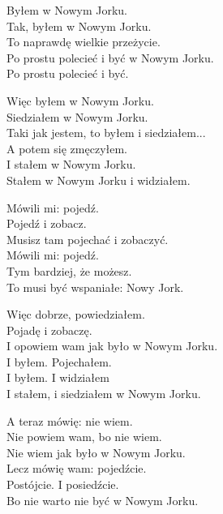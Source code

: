 \begin{text}
    Byłem w Nowym Jorku.\\
    Tak, byłem w Nowym Jorku.\\
    To naprawdę wielkie przeżycie.\\
    Po prostu polecieć i być w Nowym Jorku.\\
    Po prostu polecieć i być.

    Więc byłem w Nowym Jorku.\\
    Siedziałem w Nowym Jorku.\\
    Taki jak jestem, to byłem i siedziałem...\\
    A potem się zmęczyłem.\\
    I stałem w Nowym Jorku.\\
    Stałem w Nowym Jorku i widziałem.

    Mówili mi: pojedź.\\
    Pojedź i zobacz.\\
    Musisz tam pojechać i zobaczyć.\\
    Mówili mi: pojedź.\\
    Tym bardziej, że możesz.\\
    To musi być wspaniałe: Nowy Jork.

    Więc dobrze, powiedziałem.\\
    Pojadę i zobaczę.\\
    I opowiem wam jak było w Nowym Jorku.\\
    I byłem. Pojechałem.\\
    I byłem. I widziałem\\
    I stałem, i siedziałem w Nowym Jorku.

    A teraz mówię: nie wiem.\\
    Nie powiem wam, bo nie wiem.\\
    Nie wiem jak było w Nowym Jorku.\\
    Lecz mówię wam: pojedźcie.\\
    Postójcie. I posiedźcie.\\
    Bo nie warto nie być w Nowym Jorku.
\end{text}
\begin{chord}

\end{chord}